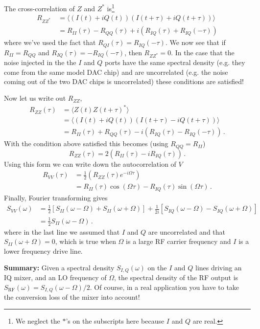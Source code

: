 The cross-correlation of $Z$ and $Z^*$ is\footnote{We neglect the $*$'s on the subscripts here because $I$ and $Q$ are real.}
\begin{align}
R_{ZZ^*}\
&= \langle (I(t) + i Q(t))(I(t+\tau) + i Q(t+\tau)) \rangle \\
&= R_{II}(\tau) - R_{QQ}(\tau) + i \left( R_{IQ}(\tau) + R_{IQ}(-\tau) \right)
\end{align}
where we've used the fact that $R_{QI}(\tau) = R_{IQ}(-\tau)$.
We now see that if $R_{II} = R_{QQ}$ and $R_{IQ}(\tau) = - R_{IQ}(-\tau)$, then $R_{ZZ^*} = 0$.
In the case that the noise injected in the the $I$ and $Q$ ports have the same spectral density (e.g. they come from the same model DAC chip) and are uncorrelated (e.g. the noise coming out of the two DAC chips is uncorrelated) these conditions are satisfied!

Now let us write out $R_{ZZ}$,
\begin{align}
R_{ZZ}(\tau)
&= \langle Z(t) Z(t+\tau)^* \rangle \\
&= \langle (I(t) + i Q(t))(I(t+\tau) - i Q(t+\tau)) \rangle \\
&= R_{II}(\tau) + R_{QQ}(\tau) - i \left( R_{IQ}(\tau) - R_{IQ}(-\tau) \right) \, .
\end{align}
With the condition above satisfied this becomes (using $R_{QQ} = R_{II}$)
\begin{equation}
R_{ZZ}(\tau) = 2 \left( R_{II}(\tau) - i R_{IQ}(\tau) \right) \, .
\end{equation}
Using this form we can write down the autocorrelation of $V$
\begin{align}
R_{VV}(\tau)
&= \frac{1}{2} \left( R_{ZZ}(\tau) e^{-i \Omega \tau} \right) \\
&= R_{II}(\tau) \cos(\Omega \tau) - R_{IQ}(\tau) \sin(\Omega \tau) \, . 
\end{align}
Finally, Fourier transforming gives
\begin{align}
S_{VV}(\omega) &=
\frac{1}{2} \left[ S_{II}(\omega - \Omega) + S_{II}(\omega + \Omega) \right]
+ \frac{1}{2i} \left[ S_{IQ}(\omega - \Omega) - S_{IQ}(\omega + \Omega) \right] \\
&= \frac{1}{2}S_{II}(\omega-\Omega) \, .
\end{align}
where in the last line we assumed that $I$ and $Q$ are uncorrelated and that $S_{II}(\omega + \Omega) = 0$, which is true when $\Omega$ is a large RF carrier frequency and $I$ is a lower frequency drive line.

\textbf{Summary:} Given a spectral density $S_{I,Q}(\omega)$ on the $I$ and $Q$ lines driving an IQ mixer, and an LO frequency of $\Omega$, the spectral density of the RF output is $S_\text{RF}(\omega) = S_{I,Q}(\omega - \Omega)/2$.
Of course, in a real application you have to take the conversion loss of the mixer into account!

